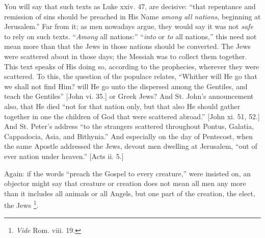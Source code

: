 You will say that such texts as Luke xxiv. 47, are decisive:
``that repentance and remission of sins should be preached in His
Name \emph{among all nations}, beginning at Jerusalem.'' Far from
it; as men nowadays argue, they would say it was not \emph{safe} to
rely on such texts. ``\emph{Among} all nations:'' ``\emph{into}
or \emph{to} all nations,'' this need not mean more than that the
Jews in those nations should be converted. The Jews were scattered
about in those days; the Messiah was to collect them together. This
text speaks of His doing so, according to the prophecies, wherever
they were scattered. To this, the question of the populace relates,
``Whither will He go that we shall not find Him? will He go unto
the dispersed among the Gentiles, and teach the Gentiles'' [John
vi. 35.] or Greek Jews? And St. John's announcement also, that He died
``not for that nation only, but that also He should gather
together in one the children of God that were scattered abroad.''
[John xi. 51, 52.] And St. Peter's address ``to the strangers
scattered throughout Pontus, Galatia, Cappadocia, Asia, and Bithynia.''
And especially on the day of Pentecost, when the same Apostle
addressed the Jews, devout men dwelling at Jerusalem, ``out of ever
nation under heaven.'' [Acts ii. 5.]

Again: if the words ``preach the Gospel to every
creature,'' were insisted on, an objector might say that creature
or creation does not mean all men any more than it includes all
animals or all Angels, but one part of the creation, the elect, the
Jews \footnote{\emph{Vide} Rom. viii. 19.}.

